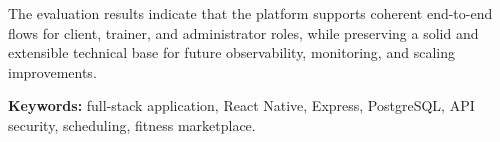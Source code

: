 The evaluation results indicate that the platform supports coherent end-to-end flows for client, trainer, and administrator roles, while preserving a solid and extensible technical base for future observability, monitoring, and scaling improvements.

\textbf{Keywords:} full-stack application, React Native, Express, PostgreSQL, API security, scheduling, fitness marketplace.

\clearpage
{}
